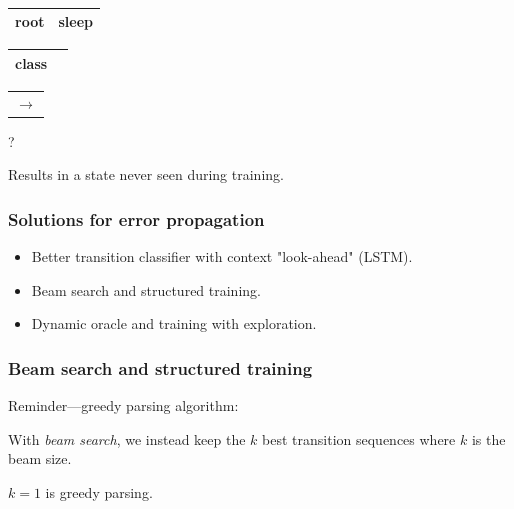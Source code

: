 \documentclass[t]{beamer}
\DeclareMathOperator*{\argmax}{arg\,max}
\begin{document}
\begin{frame}
{\begin{varwidth}{2.3\linewidth}
{\begin{dependency}
	\end{dependency}
	\\
	\begin{tabular}{|l|l|}\hline
	\color{red} root & \color{red} sleep \\ \hline
	\end{tabular}
	\hspace{24mm}
	\begin{tabular}{|l|l|}\hline
	\color{blue} class \\ \hline
	\end{tabular}
	}
	\begin{tabular}{c}$\rightarrow$\end{tabular}
	
    \vspace{5mm}
	
	\centering\huge?
    \end{varwidth}
	}
	
	\pause\vfill
	
	Results in a state never seen during training.
\end{frame}

\begin{frame}
  \frametitle{Solutions for error propagation}
  \begin{itemize}
  \item Better transition classifier with context "look-ahead" (LSTM).
  \item { Beam search and structured training.}
  \item Dynamic oracle and training with exploration.
  \end{itemize}
\end{frame}

\begin{frame}
  \frametitle{Beam search and structured training}
    Reminder---greedy parsing algorithm:
    
    \begin{algorithmic}[0]
        \STATE{$c\leftarrow\Big(\argmax_{t\in\mathcal{T}}s(t,c)\Big)(c)$}
    \ENDWHILE
    \end{algorithmic}
    
    \pause\vfill
    
    With \textit{beam search}, we instead keep the $k$ best transition sequences
    where $k$ is the beam size.
    
    \pause\vfill
    
    $k=1$ is greedy parsing.
\end{frame}
\end{document}
